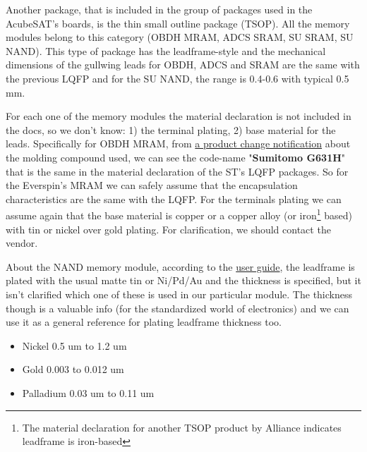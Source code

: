 \documentclass[final]{cubedoc}
\begin{document}
	Another package, that is included in the group of packages used in the AcubeSAT's boards, is the thin small outline package (TSOP). All the memory modules belong to this category (OBDH MRAM, ADCS SRAM, SU SRAM, SU NAND). This type of package has the leadframe-style and  the mechanical dimensions of the gullwing leads for OBDH, ADCS and SRAM are the same with the previous LQFP and for the SU NAND, the range is 0.4-0.6 with typical 0.5 mm. 
	
	For each one of the memory modules the material declaration is not included in the docs, so we don't know: 1) the terminal plating, 2) base material for the leads. Specifically for OBDH MRAM, from \href{https://www.everspin.com/supportdocs/MR0A16AYS35R?npath=}{a product change notification} about the molding compound used, we can see the code-name "\textbf{Sumitomo G631H}" that is the same in the material declaration of the ST's LQFP packages. So for the Everspin's MRAM we can safely assume that the encapsulation characteristics are the same with the LQFP. For the terminals plating we can assume again that the base material is copper or a copper alloy (or iron\footnote{The material declaration \cite{alliancematdoc} for another TSOP product by Alliance indicates leadframe is iron-based} based) with tin or nickel over gold plating. For clarification, we should contact the vendor.
	
	About the NAND memory module, according to the \href{https://drive.google.com/file/d/1wkUdeeUTbI0Y1cVbS6Vn8aBa2U0LKccN/view?usp=sharing}{user guide}, the leadframe is plated with the usual matte tin or Ni/Pd/Au and the thickness is specified, but it isn't clarified which one of these is used in our particular module. The thickness though is a valuable info (for the standardized world of electronics) and we can use it as a general reference for plating leadframe thickness too.
	\begin{itemize}
		\item Nickel 0.5 um to 1.2 um
		\item Gold 0.003 to 0.012 um
		\item Palladium 0.03 um to 0.11 um
	\end{itemize}
	
	
	
\end{document}
